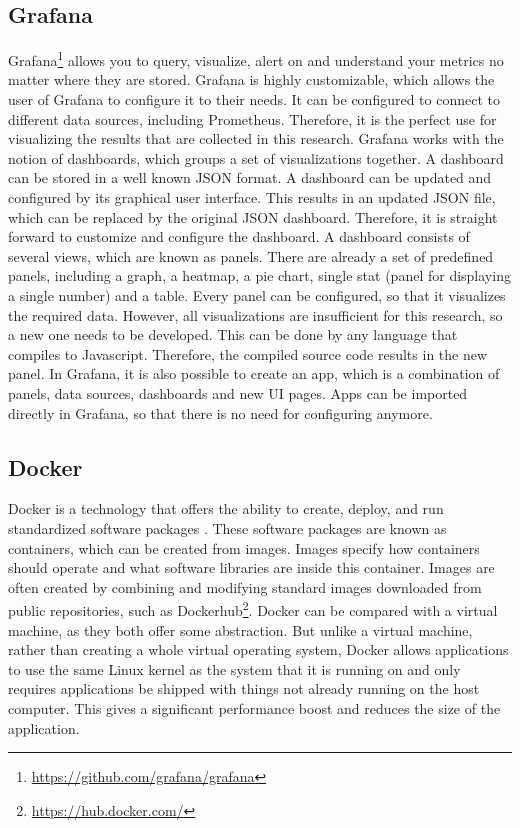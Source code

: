 \subsection{Grafana}
Grafana\footnote{\url{https://github.com/grafana/grafana}} allows you to query, visualize, alert on and understand your metrics no matter where they are stored. Grafana is highly customizable, which allows the user of Grafana to configure it to their needs. It can be configured to connect to different data sources, including Prometheus. Therefore, it is the perfect use for visualizing the results that are collected in this research. Grafana works with the notion of dashboards, which groups a set of visualizations together. A dashboard can be stored in a well known JSON format. A dashboard can be updated and configured by its graphical user interface. This results in an updated JSON file, which can be replaced by the original JSON dashboard. Therefore, it is straight forward to customize and configure the dashboard. A dashboard consists of several views, which are known as panels. There are already a set of predefined panels, including a graph, a heatmap, a pie chart, single stat (panel for displaying a single number) and a table. Every panel can be configured, so that it visualizes the required data. However, all visualizations are insufficient for this research, so a new one needs to be developed. This can be done by any language that compiles to Javascript. Therefore, the compiled source code results in the new panel. In Grafana, it is also possible to create an app, which is a combination of panels, data sources, dashboards and new UI pages. Apps can be imported directly in Grafana, so that there is no need for configuring anymore. 

\subsection{Docker}
Docker is a technology that offers the ability to create, deploy, and run standardized software packages \cite{docker}. These software packages are known as containers, which can be created from images. Images specify how containers should operate and what software libraries are inside this container. Images are often created by combining and modifying standard images downloaded from public repositories, such as Dockerhub\footnote{\url{https://hub.docker.com/}}. Docker can be compared with a virtual machine, as they both offer some abstraction.  But unlike a virtual machine, rather than creating a whole virtual operating system, Docker allows applications to use the same Linux kernel as the system that it is running on and only requires applications be shipped with things not already running on the host computer. This gives a significant performance boost and reduces the size of the application.